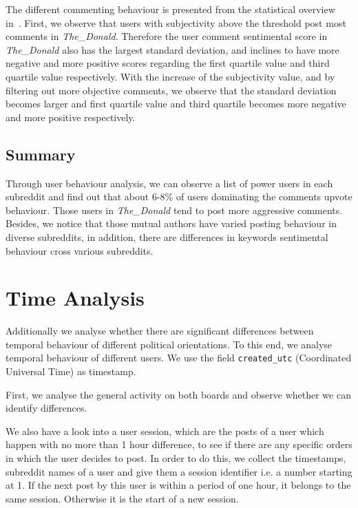 \documentclass[runningheads,a4paper]{llncs}
\begin{document}
	The different commenting behaviour is presented from the statistical overview in~. First, we observe that users with subjectivity above the threshold post most comments in \textit{The\_Donald}. Therefore the user comment sentimental score in \textit{The\_Donald} also has the largest standard deviation, and inclines to have more negative and more positive scores regarding the first quartile value and third quartile value respectively. With the increase of the subjectivity value, and by filtering out more objective comments, we observe that the standard deviation becomes larger and first quartile value and third quartile becomes more negative and more positive respectively.
	
	\subsection{Summary}\label{sub:UserAnalysis_conclusion}
	Through user behaviour analysis, we can observe a list of power users in each subreddit and find out that about 6-8\% of users dominating the comments upvote behaviour. Those users in \textit{The\_Donald} tend to post more aggressive comments. Besides, we notice that those mutual authors have varied posting behaviour in diverse subreddits, in addition, there are differences in keywords sentimental behaviour cross various subreddits.
	
	
	\section{Time Analysis}\label{sec:TimeAnalysis}
	
	Additionally we analyse whether there are significant differences between temporal behaviour of different political orientations. To this end, we analyse temporal behaviour of different users. We use the field \texttt{created\_utc} (Coordinated Universal Time) as timestamp.
	
	First, we analyse the general activity on both boards and observe whether we can identify differences.
	
	We also have a look into a user session, which are the posts of a user which happen with no more than 1 hour difference, to see if there are any specific orders in which the user decides to post. In order to do this, we collect the timestamps, subreddit names of a user and give them a session identifier i.e. a number starting at 1. If the next post by this user is within a period of one hour, it belongs to the same session. Otherwise it is the start of a new session.
	
\end{document}
